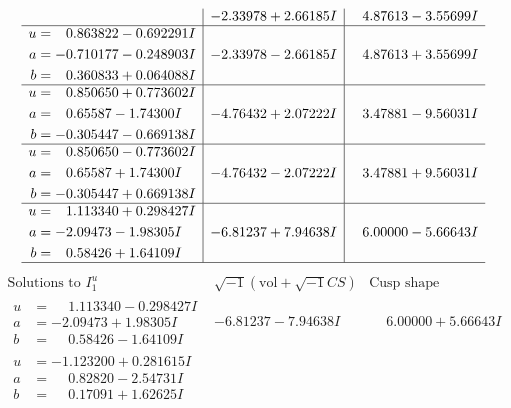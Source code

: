 \documentclass[1p]{elsarticle_modified}
\theoremstyle{definition}
\newcommand{\I}{\sqrt{-1}}
\begin{document}
$$\begin{array}{c|c|c}
 & -2.33978 + 2.66185 I & \phantom{-}4.87613 - 3.55699 I \\ \hline\begin{aligned}
u &= \phantom{-}0.863822 - 0.692291 I \\
a &= -0.710177 - 0.248903 I \\
b &= \phantom{-}0.360833 + 0.064088 I\end{aligned}
 & -2.33978 - 2.66185 I & \phantom{-}4.87613 + 3.55699 I \\ \hline\begin{aligned}
u &= \phantom{-}0.850650 + 0.773602 I \\
a &= \phantom{-}0.65587 - 1.74300 I \\
b &= -0.305447 - 0.669138 I\end{aligned}
 & -4.76432 + 2.07222 I & \phantom{-}3.47881 - 9.56031 I \\ \hline\begin{aligned}
u &= \phantom{-}0.850650 - 0.773602 I \\
a &= \phantom{-}0.65587 + 1.74300 I \\
b &= -0.305447 + 0.669138 I\end{aligned}
 & -4.76432 - 2.07222 I & \phantom{-}3.47881 + 9.56031 I \\ \hline\begin{aligned}
u &= \phantom{-}1.113340 + 0.298427 I \\
a &= -2.09473 - 1.98305 I \\
b &= \phantom{-}0.58426 + 1.64109 I\end{aligned}
 & -6.81237 + 7.94638 I & \phantom{-}6.00000 - 5.66643 I\\
 \hline 
 \end{array}$$\newpage$$\begin{array}{c|c|c}  
\text{Solutions to }I^u_{1}& \I (\text{vol} + \sqrt{-1}CS) & \text{Cusp shape}\\
 \hline 
\begin{aligned}
u &= \phantom{-}1.113340 - 0.298427 I \\
a &= -2.09473 + 1.98305 I \\
b &= \phantom{-}0.58426 - 1.64109 I\end{aligned}
 & -6.81237 - 7.94638 I & \phantom{-}6.00000 + 5.66643 I \\ \hline\begin{aligned}
u &= -1.123200 + 0.281615 I \\
a &= \phantom{-}0.82820 - 2.54731 I \\
b &= \phantom{-}0.17091 + 1.62625 I\end{aligned}

\end{array}$$
\end{document}
